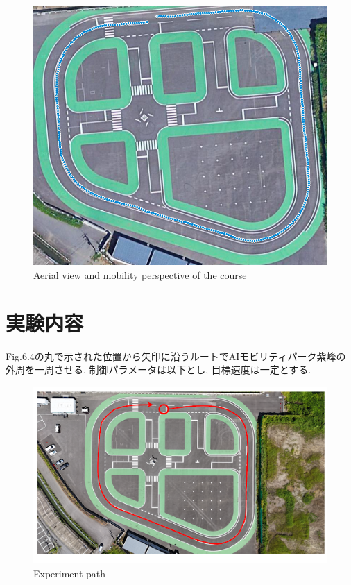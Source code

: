 \begin{figure}[H]
  \centering
 \includegraphics[keepaspectratio, scale=0.4]
      {images/targetpath.png}
 \caption{Aerial view and mobility perspective of the course}
 \label{fig:course}
\end{figure}

\section{実験内容}
Fig.6.4の丸で示された位置から矢印に沿うルートでAIモビリティパーク紫峰の外周を一周させる.
制御パラメータは以下とし, 目標速度は一定とする.

\begin{figure}[H]
  \centering
 \includegraphics[keepaspectratio, scale=0.6]
      {images/AIFormulapath.png}
 \caption{Experiment path}
 \label{fig:path}
\end{figure}

